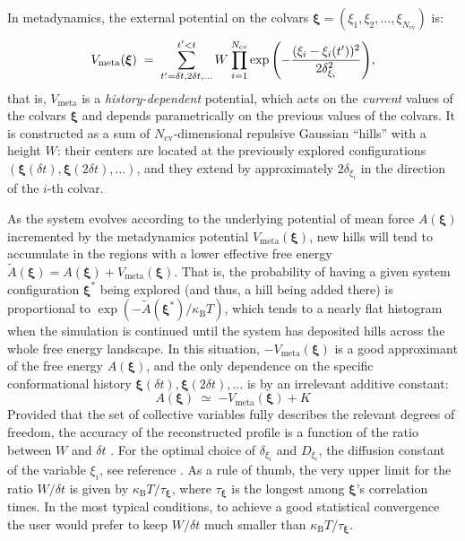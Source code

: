 In metadynamics, the external potential on the colvars $\bm{\xi} =
(\xi_{1}, \xi_{2}, \ldots, \xi_{N_{\mathrm{cv}}})$ is:
\begin{equation}
  \label{eq:colvars_meta_pot}
  V_{\mathrm{meta}}({\mbox{\boldmath{$\xi$}}}) \; = \; {
    \sum_{t' = \delta{}t, \\ 2\delta{}t, \\ \ldots}^{t'<t} W \: {
      \prod_{i = 1}^{N_{\mathrm{cv}}}
      \exp\left(-\frac{(\xi_{i}-\xi_{i}(t'))^{2}}{2\delta_{\xi_{i}}^{2}}\right)
    }
  }\mathrm{,}
\end{equation}
that is, $V_{\mathrm{meta}}$ is a \emph{history-dependent} potential,
which acts on the \emph{current} values of the colvars $\bm{\xi}$ and
depends parametrically on the previous values of the colvars.  It is
constructed as a sum of $N_{\mathrm{cv}}$-dimensional repulsive
Gaussian ``hills'' with a height $W$: their centers are located at the
previously explored configurations $\left(\bm{\xi}(\delta{}t),
  \bm{\xi}(2\delta{}t), \ldots\right)$, and they extend by
approximately $2\delta_{\xi_{i}}$ in the direction of the $i$-th
colvar.

As the system evolves according to the underlying potential of mean
force $A(\bm{\xi})$ incremented by the metadynamics potential
$V_{\mathrm{meta}}(\bm{\xi})$, new hills will tend to accumulate in
the regions with a lower effective free energy $\tilde{A}(\bm{\xi}) =
A(\bm{\xi})+V_{\mathrm{meta}}(\bm{\xi})$.  That is, the probability of
having a given system configuration $\bm{\xi^{*}}$ being explored (and
thus, a hill being added there) is proportional to
$\exp\left(-\tilde{A}(\bm{\xi^{*}})/\kappa_{\mathrm{B}}T\right)$,
which tends to a nearly flat histogram when the simulation is
continued until the system has deposited hills across the whole free
energy landscape.  In this situation, $-V_{\mathrm{meta}}(\bm{\xi})$
is a good approximant of the free energy $A(\bm{\xi})$, and the only
dependence on the specific conformational history
$\bm{\xi}(\delta{}t), \bm{\xi}(2\delta{}t), \ldots$ is by an
irrelevant additive constant:
\begin{equation}
  \label{eq:colvars_meta_fes}
  A(\bm{\xi}) \; \simeq \; {
    -V_{\mathrm{meta}}(\bm{\xi}) + K
  }
\end{equation}
Provided that the set of collective variables fully describes the
relevant degrees of freedom, the accuracy of the reconstructed profile
is a function of the ratio between $W$ and $\delta{}t$
\cite{Bussi2006}.  For the optimal choice of $\delta_{\xi_{i}}$ and
$D_{\xi_{i}}$, the diffusion constant of the variable $\xi_{i}$, see
reference \cite{Bussi2006}.  As a rule of thumb, the very upper limit
for the ratio $W/\delta{}t$ is given by
$\kappa_{\mathrm{B}}T/\tau_{\bm{\xi}}$, where $\tau_{\bm{\xi}}$ is the
longest among $\bm{\xi}$'s correlation times.  In the most typical
conditions, to achieve a good statistical convergence the user would
prefer to keep $W/\delta{}t$ much smaller than
$\kappa_{\mathrm{B}}T/\tau_{\bm{\xi}}$.

